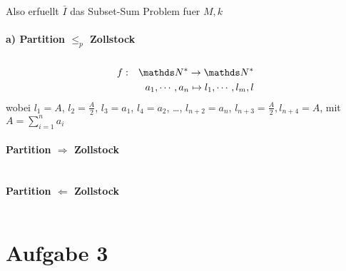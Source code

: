 Also erfuellt $\bar{I}$ das Subset-Sum Problem fuer $M,k$


\paragraph{a) Partition $\leq_p$ Zollstock} $ $
\begin{eqnarray}
f &:& \N^* \to \N^* \\
  & & a_1,\cdots,a_n \mapsto l_1,\cdots,l_m,l
\end{eqnarray}
wobei $l_1 = A$, $l_2 = \frac{A}{2}$, $l_3 = a_1$, $l_4 = a_2$, \ldots, $l_{n+2} = a_n$,
      $l_{n+3} = \frac{A}{2}, l_{n+4} = A$, mit $A = \sum_{i=1}^n a_i$

\paragraph{Partition $\Rightarrow$ Zollstock} $ $



\paragraph{Partition $\Leftarrow$ Zollstock} $ $

\section*{Aufgabe 3}


